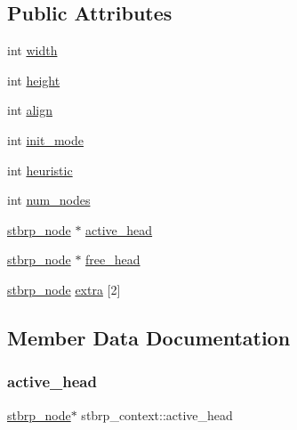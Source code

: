 \subsection*{Public Attributes}
\begin{DoxyCompactItemize}
\item 
int \hyperlink{structstbrp__context_a70cfcb2044ce8397cc440d28b30c09b2}{width}
\item 
int \hyperlink{structstbrp__context_af3715a6f3faecfb4fac8f6ccbb71f9c7}{height}
\item 
int \hyperlink{structstbrp__context_ae36053e2001a725aec2b5756dc990481}{align}
\item 
int \hyperlink{structstbrp__context_a007509feee322404083034e4c2d3dc5d}{init\+\_\+mode}
\item 
int \hyperlink{structstbrp__context_a4b61a7f94e50a54c075e2a8f99f6503a}{heuristic}
\item 
int \hyperlink{structstbrp__context_afa8105d4ef6d3e0ae5aaf8e1ed4b2c58}{num\+\_\+nodes}
\item 
\hyperlink{structstbrp__node}{stbrp\+\_\+node} $\ast$ \hyperlink{structstbrp__context_a13277239636803aff28f00b0a0376120}{active\+\_\+head}
\item 
\hyperlink{structstbrp__node}{stbrp\+\_\+node} $\ast$ \hyperlink{structstbrp__context_a1336ae32373663847866cc65904c2839}{free\+\_\+head}
\item 
\hyperlink{structstbrp__node}{stbrp\+\_\+node} \hyperlink{structstbrp__context_a0b80e1fbdac125427526f3500d4e7624}{extra} \mbox{[}2\mbox{]}
\end{DoxyCompactItemize}


\subsection{Member Data Documentation}
\mbox{\label{structstbrp__context_a13277239636803aff28f00b0a0376120}} 
\subsubsection{\texorpdfstring{active\+\_\+head}{active\_head}}
{\footnotesize\ttfamily \hyperlink{structstbrp__node}{stbrp\+\_\+node}$\ast$ stbrp\+\_\+context\+::active\+\_\+head}

\mbox{\label{structstbrp__context_ae36053e2001a725aec2b5756dc990481}} 
